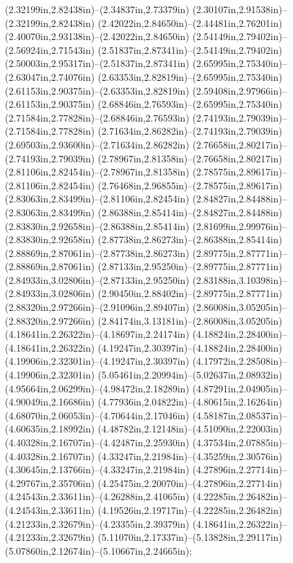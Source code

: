 (2.32199in,2.82438in)--(2.34837in,2.73379in) (2.30107in,2.91538in)--(2.32199in,2.82438in) (2.42022in,2.84650in)--(2.44481in,2.76201in) (2.40070in,2.93138in)--(2.42022in,2.84650in) (2.54149in,2.79402in)--(2.56924in,2.71543in) (2.51837in,2.87341in)--(2.54149in,2.79402in) (2.50003in,2.95317in)--(2.51837in,2.87341in) (2.65995in,2.75340in)--(2.63047in,2.74076in) (2.63353in,2.82819in)--(2.65995in,2.75340in) (2.61153in,2.90375in)--(2.63353in,2.82819in) (2.59408in,2.97966in)--(2.61153in,2.90375in) (2.68846in,2.76593in)--(2.65995in,2.75340in) (2.71584in,2.77828in)--(2.68846in,2.76593in) (2.74193in,2.79039in)--(2.71584in,2.77828in) (2.71634in,2.86282in)--(2.74193in,2.79039in) (2.69503in,2.93600in)--(2.71634in,2.86282in) (2.76658in,2.80217in)--(2.74193in,2.79039in) (2.78967in,2.81358in)--(2.76658in,2.80217in) (2.81106in,2.82454in)--(2.78967in,2.81358in) (2.78575in,2.89617in)--(2.81106in,2.82454in) (2.76468in,2.96855in)--(2.78575in,2.89617in) (2.83063in,2.83499in)--(2.81106in,2.82454in) (2.84827in,2.84488in)--(2.83063in,2.83499in) (2.86388in,2.85414in)--(2.84827in,2.84488in) (2.83830in,2.92658in)--(2.86388in,2.85414in) (2.81699in,2.99976in)--(2.83830in,2.92658in) (2.87738in,2.86273in)--(2.86388in,2.85414in) (2.88869in,2.87061in)--(2.87738in,2.86273in) (2.89775in,2.87771in)--(2.88869in,2.87061in) (2.87133in,2.95250in)--(2.89775in,2.87771in) (2.84933in,3.02806in)--(2.87133in,2.95250in) (2.83188in,3.10398in)--(2.84933in,3.02806in) (2.90450in,2.88402in)--(2.89775in,2.87771in) (2.88320in,2.97266in)--(2.91096in,2.89407in) (2.86008in,3.05205in)--(2.88320in,2.97266in) (2.84174in,3.13181in)--(2.86008in,3.05205in) (4.18641in,2.26322in)--(4.18697in,2.24174in) (4.18824in,2.28400in)--(4.18641in,2.26322in) (4.19247in,2.30397in)--(4.18824in,2.28400in) (4.19906in,2.32301in)--(4.19247in,2.30397in) (4.17972in,2.28508in)--(4.19906in,2.32301in) (5.05461in,2.20994in)--(5.02637in,2.08932in) (4.95664in,2.06299in)--(4.98472in,2.18289in) (4.87291in,2.04905in)--(4.90049in,2.16686in) (4.77936in,2.04822in)--(4.80615in,2.16264in) (4.68070in,2.06053in)--(4.70644in,2.17046in) (4.58187in,2.08537in)--(4.60635in,2.18992in) (4.48782in,2.12148in)--(4.51090in,2.22003in) (4.40328in,2.16707in)--(4.42487in,2.25930in) (4.37534in,2.07885in)--(4.40328in,2.16707in) (4.33247in,2.21984in)--(4.35259in,2.30576in) (4.30645in,2.13766in)--(4.33247in,2.21984in) (4.27896in,2.27714in)--(4.29767in,2.35706in) (4.25475in,2.20070in)--(4.27896in,2.27714in) (4.24543in,2.33611in)--(4.26288in,2.41065in) (4.22285in,2.26482in)--(4.24543in,2.33611in) (4.19526in,2.19717in)--(4.22285in,2.26482in) (4.21233in,2.32679in)--(4.23355in,2.39379in) (4.18641in,2.26322in)--(4.21233in,2.32679in) (5.11070in,2.17337in)--(5.13828in,2.29117in) (5.07860in,2.12674in)--(5.10667in,2.24665in);
